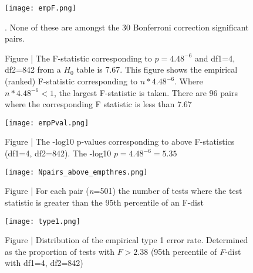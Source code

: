 \documentclass[paper=a4, fontsize=11pt]{scrartcl}         %
\numberwithin{equation}{section}                  %
\numberwithin{figure}{section}                    %
\numberwithin{table}{section}                   %
\begin{document}
\newpage

\begin{figure}[H]
\centering
\texttt{[image: empF.png]}
\caption*{Figure | The F-statistic corresponding to $p=4.48^{-6}$ and df1=4, df2=842 from a $H_0$ table is 7.67. This figure shows the empirical (ranked) F-statistic corresponding to $n * 4.48^{-6}$. Where $n * 4.48^{-6} < 1$, the largest F-statistic is taken. There are 96 pairs where the corresponding F statistic is less than 7.67}. None of these are amongst the 30 Bonferroni correction significant pairs.
\end{figure}


\begin{figure}[H]
\centering
\texttt{[image: empPval.png]}
\caption*{Figure | The -log10 p-values corresponding to above F-statistics (df1=4, df2=842). The -log10 $p=4.48^{-6} = 5.35$}
\end{figure}



\newpage

\begin{figure}[H]
\centering
\texttt{[image: Npairs\_above\_empthres.png]}
\caption*{Figure | For each pair (\emph{n}=501) the number of tests where the test statistic is greater than the 95th percentile of an F-dist}
\end{figure}


\begin{figure}[H]
\centering
\texttt{[image: type1.png]}
\caption*{Figure | Distribution of the empirical type 1 error rate. Determined as the proportion of tests with $F > 2.38$ (95th percentile of \emph{F}-dist with df1=4, df2=842)}
\end{figure}


\newpage
\end{document}
